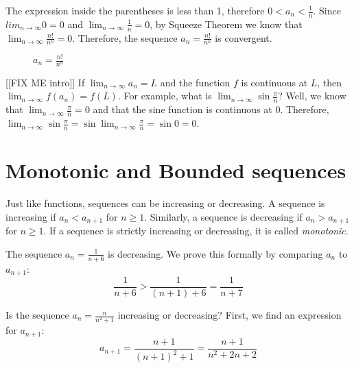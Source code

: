 The expression inside the parentheses is less than 1, therefore $0 < 
a_n < \frac{1}{n}$. Since $lim_{n \to \infty} 0 = 0$ and $\lim_{n \to 
\infty} \frac{1}{n} = 0$, by Squeeze Theorem we know that $\lim_{n 
\to \infty} \frac{n!}{n^n} = 0$. Therefore, the sequence $a_n = 
\frac{n!}{n^n}$ is convergent. 

\begin{figure}[htbp]
\centering
    \caption{$a_n = \frac{n!}{n^n}$}
    \label{fig:factorial}
\end{figure}

[[FIX ME intro]]
If $\lim_{n \to \infty} a_n = L$ and the function $f$ is continuous 
at $L$, then $\lim_{n \to \infty} f(a_n) = f(L)$. For example, what 
is $\lim_{n \to \infty} \sin{\frac{\pi}{n}}$? Well, we know that 
$\lim_{n \to \infty} \frac{\pi}{n} = 0$ and that the sine function is 
continuous at 0. Therefore, $\lim_{n \to \infty} \sin{\frac{\pi}{n}} 
= \sin{\lim_{n \to \infty} \frac{\pi}{n}} = \sin{0} = 0$. 

\section{Monotonic and Bounded sequences}
Just like functions, sequences can be increasing or decreasing. A 
sequence is increasing if $a_n < a_{n+1}$ for $n \geq 1$. Similarly, 
a sequence is decreasing if $a_n > a_{n+1}$ for $n \geq 1$. If a 
sequence is strictly increasing or decreasing, it is called 
\textit{monotonic}. 

The sequence $a_n = \frac{1}{n + 6}$ is decreasing. We prove this 
formally by comparing $a_n$ to $a_{n+1}$:
$$\frac{1}{n + 6} > \frac{1}{(n + 1) + 6} = \frac{1}{n + 7}$$

Is the sequence $a_n = \frac{n}{n^2 + 1}$ increasing or decreasing? 
First, we find an expression for $a_{n+1}$:
$$a_{n + 1} = \frac{n + 1}{(n + 1)^2 + 1} = \frac{n + 1}{n^2 + 2n + 2}$$

